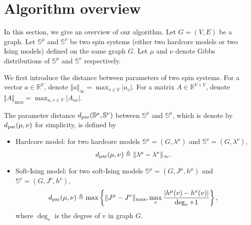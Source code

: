 \section{Algorithm overview}
In this section, we give an overview of our algorithm.
Let $G=(V,E)$ be a graph. 
Let $\mathbb{S}^\mu$ and $\mathbb{S}^\nu$ be two spin systems (either two hardcore models or two Ising models) defined on the same graph $G$.
Let $\mu$ and $\nu$ denote Gibbs distributions of $\mathbb{S}^\mu$ and $\mathbb{S}^\nu$ respectively.

We first introduce the distance between parameters of two spin systems. For a vector $a \in \mathbb{R}^V$, denote $\Vert a \Vert_\infty = \max_{v \in V}|a_v|$. For a matrix $A \in  \mathbb{R}^{V \times V}$, denote $\Vert A \Vert_{\max} = \max_{u,v \in V}|A_{uv}|$.
\begin{definition}\label{def:dis}
The parameter distance $d_\mathrm{par}(\mathbb{S}^\mu,\mathbb{S}^\nu)$ between $\mathbb{S}^\mu$ and $\mathbb{S}^\mu$, which is denote by  $d_\mathrm{par}(\mu,\nu)$ for simplicity, is defined by  
\begin{itemize}
    \item Hardcore model: for two hardcore models $\mathbb{S}^\mu = (G,\lambda^\mu)$ and  $\mathbb{S}^\nu = (G,\lambda^\nu)$, \[d_\mathrm{par}(\mu,\nu) \triangleq \Vert \lambda^\mu - \lambda^\nu \Vert_{\infty}.\]
    \item Soft-Ising model:  for two soft-Ising models $\mathbb{S}^\mu = (G,J^\mu,h^\mu)$ and $\mathbb{S}^\nu = (G,J^\nu,h^\nu)$, \[d_\mathrm{par}(\mu,\nu) \triangleq \max\left\{ \Vert J^\mu - J^\nu \Vert_{\max}, \max_v \frac{|h^\mu(v)-h^\nu(v)|}{\deg_v+1} \right\},\]
    where $\deg_v$ is the degree of $v$ in graph $G$.
\end{itemize}
\end{definition}

